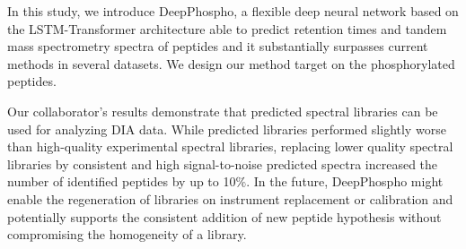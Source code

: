 In this study, we introduce DeepPhospho, a flexible deep neural network based on the LSTM-Transformer architecture able to predict retention times and tandem mass spectrometry spectra of peptides and it substantially surpasses current methods in several datasets. We design our method target on the phosphorylated peptides.

Our collaborator's results demonstrate that predicted spectral libraries can be used for analyzing DIA data. While predicted
libraries performed slightly worse than high-quality experimental spectral libraries, replacing lower quality
spectral libraries by consistent and high signal-to-noise predicted spectra increased the number of identified
peptides by up to 10$\%$. In the future, DeepPhospho might enable the regeneration of libraries on instrument replacement
or calibration and potentially supports the consistent addition of new peptide hypothesis without compromising
the homogeneity of a library.